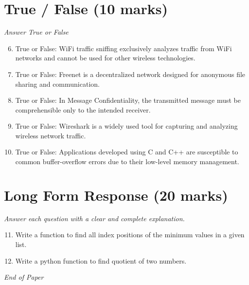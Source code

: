 \documentclass[12pt]{article}
\begin{document}
\section*{True / False (10 marks)}
\textit{Answer True or False}
\begin{enumerate}[label=\arabic*.]
\setcounter{enumi}{5}
\item True or False: WiFi traffic sniffing exclusively analyzes traffic from WiFi networks and cannot be used for other wireless technologies.
\item True or False: Freenet is a decentralized network designed for anonymous file sharing and communication.
\item True or False: In Message Confidentiality, the transmitted message must be comprehensible only to the intended receiver.
\item True or False: Wireshark is a widely used tool for capturing and analyzing wireless network traffic.
\item True or False: Applications developed using C and C++ are susceptible to common buffer-overflow errors due to their low-level memory management.
\end{enumerate}

\section*{Long Form Response (20 marks)}
\textit{Answer each question with a clear and complete explanation.}
\begin{enumerate}[label=\arabic*.]
\setcounter{enumi}{10}
\item Write a function to find all index positions of the minimum values in a given list.
\item Write a python function to find quotient of two numbers.
\end{enumerate}

\vfill
\noindent\textit{End of Paper}
\end{document}
